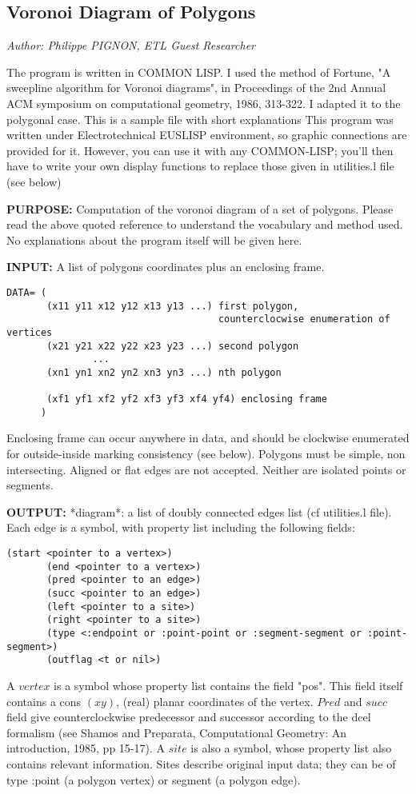 \subsection{Voronoi Diagram of Polygons}

\begin{refdesc}

\hfill {\em Author: Philippe PIGNON, ETL Guest Researcher}

The program is written in COMMON LISP. I used the method of Fortune, 
 "A sweepline algorithm for Voronoi diagrams", in Proceedings of
the 2nd Annual ACM symposium on computational geometry, 1986, 313-322.
I adapted it to the polygonal case. This is a sample file with short
explanations
This program was written under Electrotechnical EUSLISP environment,
so graphic connections are provided for it. 
However, you can use it with any COMMON-LISP; you'll then have to write your
own display functions to replace those given in utilities.l file (see below)

{\bf PURPOSE:} Computation of the voronoi diagram of a set of polygons.
Please read the above quoted reference to understand the vocabulary and
method used. No explanations about the program itself  will be given here.

{\bf INPUT:} A list of polygons coordinates plus an enclosing frame.
\begin{verbatim}
DATA= (
       (x11 y11 x12 y12 x13 y13 ...) first polygon,
                                     counterclocwise enumeration of vertices
       (x21 y21 x22 y22 x23 y23 ...) second polygon
               ... 
       (xn1 yn1 xn2 yn2 xn3 yn3 ...) nth polygon
	     
       (xf1 yf1 xf2 yf2 xf3 yf3 xf4 yf4) enclosing frame
      )
\end{verbatim}
Enclosing frame can occur anywhere in data, and should be clockwise enumerated
for outside-inside marking consistency (see below). Polygons must be simple,
non intersecting. Aligned or flat edges are not accepted. 
Neither are isolated points or segments.

{\bf OUTPUT:} *diagram*: a list of doubly connected edges list
(cf utilities.l file). Each edge is a symbol, with  property list
including the following fields:
\begin{verbatim}
(start <pointer to a vertex>)
       (end <pointer to a vertex>)
       (pred <pointer to an edge>)
       (succ <pointer to an edge>)
       (left <pointer to a site>)
       (right <pointer to a site>)
       (type <:endpoint or :point-point or :segment-segment or :point-segment>)
       (outflag <t or nil>)
\end{verbatim}
A $vertex$ is a symbol whose property list contains the field "pos".
This field itself contains a cons $(x y)$, (real) planar coordinates
of the vertex.
$Pred$ and $succ$ field give counterclockwise predecessor and successor
according to the dcel formalism (see Shamos and Preparata,
Computational Geometry: An introduction, 1985, pp 15-17).
A $site$ is also a symbol, whose property list also contains relevant
information.
Sites describe original input data; they can be of type
:point (a polygon vertex) or segment (a polygon edge).


\end{refdesc}
